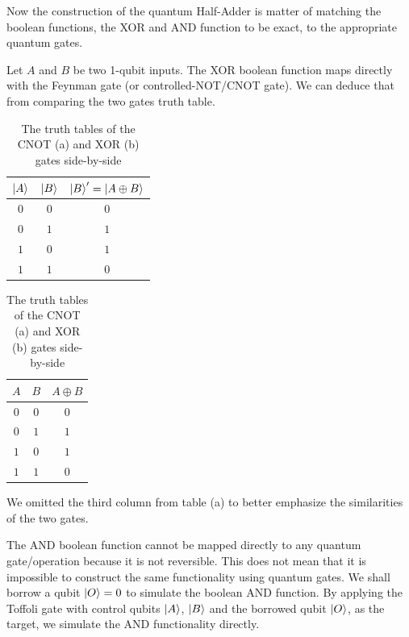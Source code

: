 Now the construction of the quantum Half-Adder is matter of matching the boolean functions, the XOR and AND function to be exact, to the
appropriate quantum gates.

Let $A$ and $B$ be two 1-qubit inputs. The XOR boolean function maps directly with the Feynman gate (or controlled-NOT/CNOT gate). We can deduce that
from comparing the two gates truth table.

\begin{table}[ht]
    \centering
    \begin{subtable}[h]{0.45\textwidth}
        \centering
        \begin{tabular}{cc|c}
            $\ket{A}$ & $\ket{B}$ & $\ket{B}'=\ket{A \oplus B}$ \\
            \hline
            $0$ & $0$ & $0$ \\
            $0$ & $1$ & $1$ \\
            $1$ & $0$ & $1$ \\
            $1$ & $1$ & $0$ \\
        \end{tabular}
        \caption{CNOT's truth table}
    \end{subtable}
    \begin{subtable}[h]{0.45\textwidth}
        \centering
        \begin{tabular}{cc|c}
            $A$ & $B$ & $A \oplus B$ \\
            \hline
            $0$ & $0$ & $0$ \\
            $0$ & $1$ & $1$ \\
            $1$ & $0$ & $1$ \\
            $1$ & $1$ & $0$ \\
        \end{tabular}
        \caption{XOR's truth table}
    \end{subtable}
    \caption{The truth tables of the CNOT (a) and XOR (b) gates side-by-side}
\end{table}

We omitted the third column from table (a) to better emphasize the similarities of the two gates.

The AND boolean function cannot be mapped directly to any quantum gate/operation because it is not reversible. This does not mean that it is
impossible to construct the same functionality using quantum gates. We shall borrow a  qubit $\ket{O} = 0$ to simulate the boolean AND function.
By applying the Toffoli gate with control qubits $\ket{A}$, $\ket{B}$ and the borrowed qubit $\ket{O}$, as the target, we simulate the AND functionality
directly.

